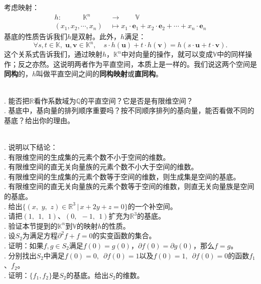 \documentclass[12pt,UTF8,fontset=none]{ctexbook}
\begin{document}
考虑映射：
\begin{align*}
    h:\quad \qquad \mathbb{K}^n\qquad &\rightarrow \qquad \mathbb{V} \\
    (x_1, x_2, \cdots , x_n) &\mapsto x_1\cdot \mathbf{e}_1 + x_2\cdot \mathbf{e}_2 + \cdots + x_n\cdot \mathbf{e}_n
\end{align*}
基底的性质告诉我们$h$是双射。此外，$h$满足：
$$ \forall s, t \in \mathbb{K}, \; \mathbf{u}, \mathbf{v}\in \mathbb{K}^n, \quad s\cdot h(\mathbf{u}) + t\cdot h(\mathbf{v}) = h(s\cdot \mathbf{u} + t\cdot \mathbf{v}). $$
这个关系式告诉我们，通过映射$h$，$\mathbb{K}^n$中对向量的操作，就可以变成$\mathbb{V}$中的同样操作；反之亦然。这说明两者作为平直空间，本质上是一样的。我们说这两个空间是\textbf{同构}的，$h$叫做平直空间之间的\textbf{同构映射}或\textbf{直同构}。

\begin{sk}
    \mbox{} \\
    . 能否把$\mathbb{R}$看作系数域为$\mathbb{Q}$的平直空间？它是否是有限维空间？\\
    . 基底中，基向量的排列顺序重要吗？按不同顺序排列的基向量，能否看做不同的基底？给出你的理由。
\end{sk}

\begin{xt}
    \mbox{} \\
    . 说明以下结论：\\
    . 有限维空间的生成集的元素个数不小于空间的维数。\\
    . 有限维空间的直无关向量族的元素个数不小大于空间的维数。\\
    . 有限维空间的生成集的元素个数等于空间的维数，则生成集是空间的基底。\\
    . 有限维空间的直无关向量族的元素个数等于空间的维数，则直无关向量族是空间的基底。\\
    . 给出$\{(x,\,\,y,\,\,z)\in\mathbb{R}^3 \, | \, x + 2y + z = 0 \}$的一个补空间。\\
    . 请把$(1,\;\,1, \;\,1)$、$(0,\;\, -1, \;\,1)$扩充为$\mathbb{R}^3$的基底。\\
    . 验证本节提到的$\mathbb{K}^n$到$\mathbb{V}$的映射$h$的性质。\\
    . 设$S_2$为满足方程$\partial^2 f + f = 0$的实变函数的集合。\\
    . 证明：如果$f,g\in S_2$满足$f(0) = g(0)$，$\partial f(0) = \partial g(0)$，那么$f = g$。\\
    . 分别找出$S_2$中满足$f(0) = 0, \,\,\, \partial f(0) = 1$以及$f(0) = 1, \,\,\, \partial f(0) = 0$的函数$f_1$、$f_2$。\\
    . 证明：$\{f_1, f_2\}$是$S_2$的基底。给出$S_2$的维数。
\end{xt}
\end{document}
